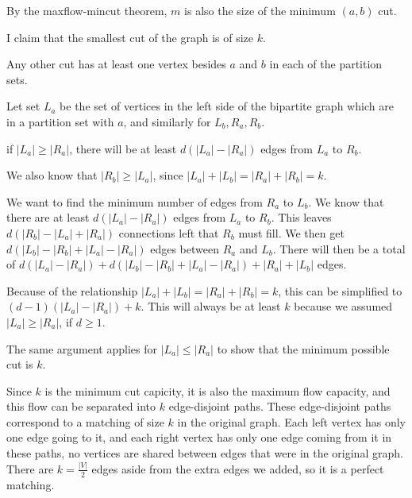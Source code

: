 \documentclass{article}
\begin{document}
By the maxflow-mincut theorem, $m$ is also the size of the minimum $(a,b)$ cut.

I claim that the smallest cut of the graph is of size $k$.

Any other cut has at least one vertex besides $a$ and $b$ in each of the
partition sets.

Let set $L_a$ be the set of vertices in the left side of the bipartite graph
which are in a partition set with $a$, and similarly for $L_b, R_a, R_b$.

if $|L_a| \geq |R_a|$, there will be at least $d(|L_a| - |R_a|)$ edges from $L_a$
to $R_b$.

We also know that $|R_b| \geq |L_a|$, since $|L_a|+|L_b| =|R_a|+|R_b|=k$.

We want to find the minimum number of edges from $R_a$ to $L_b$. We know that
there are at least $d(|L_a| - |R_a|)$ edges from $L_a$ to $R_b$. This leaves
$d(|R_b| - |L_a| + |R_a|)$ connections left that $R_b$ must fill. We then get
$d(|L_b| - |R_b| + |L_a| - |R_a|)$ edges between $R_a$ and $L_b$. There will
then be a total of $d(|L_a|-|R_a|) + d(|L_b| - |R_b| + |L_a| - |R_a|) + |R_a|
+ |L_b|$ edges.

Because of the relationship $|L_a|+|L_b| =|R_a|+|R_b|=k$, this can be
simplified to $(d-1)(|L_a| -|R_a|) + k$. This will always be at least $k$
because we assumed $|L_a| \geq |R_a|$, if $d \geq 1$.

The same argument applies for $|L_a| \leq |R_a|$ to show that the minimum
possible cut is $k$.

Since $k$ is the minimum cut capicity, it is also the maximum flow capacity,
and this flow can be separated into $k$ edge-disjoint paths. These
edge-disjoint paths correspond to a matching of size $k$ in the original
graph. Each left vertex has only one edge going to it, and each right vertex
has only one edge coming from it in these paths, no vertices are shared
between edges that were in the original graph. There are $k = \frac{|V|}{2}$
edges aside from the extra edges we added, so it is a perfect matching.
\end{document}
